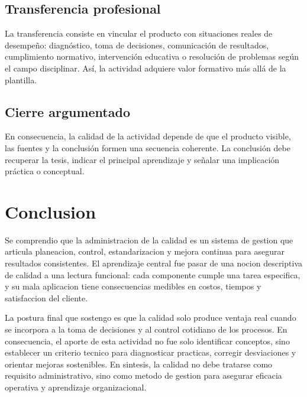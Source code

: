 \documentclass[
	spanish,
	letterpaper, oneside
]{article}
\begin{document}
\subsection*{Transferencia profesional}
La transferencia consiste en vincular el producto con situaciones reales de desempeño: diagnóstico, toma de decisiones, comunicación de resultados, cumplimiento normativo, intervención educativa o resolución de problemas según el campo disciplinar. Así, la actividad adquiere valor formativo más allá de la plantilla.

\subsection*{Cierre argumentado}
En consecuencia, la calidad de la actividad depende de que el producto visible, las fuentes y la conclusión formen una secuencia coherente. La conclusión debe recuperar la tesis, indicar el principal aprendizaje y señalar una implicación práctica o conceptual.


\section{Conclusion}

Se comprendio que la administracion de la calidad es un sistema de gestion que articula planeacion, control, estandarizacion y mejora continua para asegurar resultados consistentes. El aprendizaje central fue pasar de una nocion descriptiva de calidad a una lectura funcional: cada componente cumple una tarea especifica, y su mala aplicacion tiene consecuencias medibles en costos, tiempos y satisfaccion del cliente.

La postura final que sostengo es que la calidad solo produce ventaja real cuando se incorpora a la toma de decisiones y al control cotidiano de los procesos. En consecuencia, el aporte de esta actividad no fue solo identificar conceptos, sino establecer un criterio tecnico para diagnosticar practicas, corregir desviaciones y orientar mejoras sostenibles. En sintesis, la calidad no debe tratarse como requisito administrativo, sino como metodo de gestion para asegurar eficacia operativa y aprendizaje organizacional.
\end{document}
